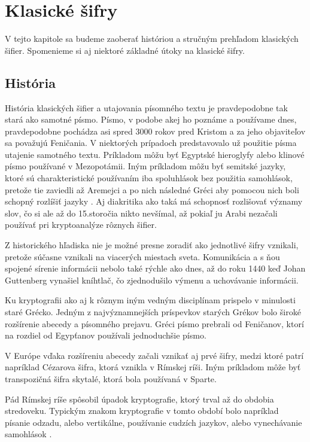 \section{Klasické šifry}
V tejto kapitole sa budeme zaoberať históriou a stručným prehľadom klasických šifier.
Spomenieme si aj niektoré základné útoky na klasické šifry. 

\subsection{História}
História klasických šifier a utajovania písomného textu je pravdepodobne tak stará ako samotné písmo.
Písmo, v podobe akej ho poznáme a používame dnes, pravdepodobne pochádza asi spred 3000 rokov pred Kristom a za jeho objaviteľov sa považujú
Feničania.
V niektorých prípadoch predstavovalo už použitie písma utajenie samotného textu.
Príkladom môžu byť Egyptské hieroglyfy alebo klinové písmo používané v Mezopotámii.
Iným príkladom môžu byť semitské jazyky, ktoré sú charakteristické používaním iba spoluhlások bez použitia samohlások,
pretože tie zaviedli až Aremejci a po nich následné Gréci aby pomocou nich boli schopný rozlíšiť jazyky \cite{ks}.
Aj diakritika ako taká má schopnosť rozlišovať významy slov, čo si ale až do 15.storočia nikto nevšímal,
až pokiaľ ju Arabi nezačali používať pri kryptoanalýze rôznych šifier.

Z historického hľadiska nie je možné presne zoradiť ako jednotlivé šifry vznikali, pretože súčasne vznikali na viacerých miestach sveta.
Komunikácia a s ňou spojené sírenie informácii nebolo také rýchle ako dnes, až do roku 1440 keď Johan Guttenberg vynašiel kníhtlač,
čo zjednodušilo výmenu a uchovávanie informácii.

Ku kryptografii ako aj k rôznym iným vedným disciplínam prispelo v minulosti staré Grécko.
Jedným z najvýznamnejších príspevkov starých Grékov bolo široké rozšírenie abecedy a písomného prejavu.
Gréci písmo prebrali od Feničanov, ktorí na rozdiel od Egypťanov používali jednoduchšie písmo.

V Európe vďaka rozšíreniu abecedy začali vznikať aj prvé šifry, medzi ktoré patrí napríklad Cézarova šifra, ktorá vznikla v Rímskej ríši.
Iným príkladom môže byť transpozičná šifra skytalé, ktorá bola používaná v Sparte.

Pád Rímskej ríše spôsobil úpadok kryptografie, ktorý trval až do obdobia stredoveku. Typickým znakom kryptografie v tomto období bolo
napríklad písanie odzadu, alebo vertikálne, používanie cudzích jazykov, alebo vynechávanie samohlások \cite{ks}.

